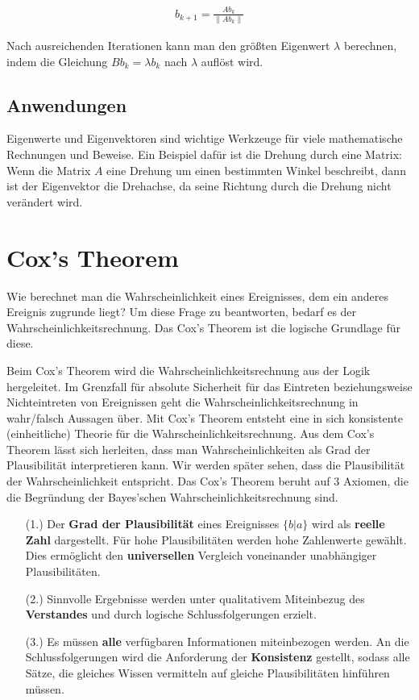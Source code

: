 \documentclass[]{dsadokumentation}
\begin{document}
\begin{equation}
  \begin{aligned}
    b_{k+1} = \frac{Ab_k}{\left\lVert Ab_k \right\rVert }
  \end{aligned}
\end{equation}

Nach ausreichenden Iterationen kann man den größten Eigenwert $\lambda$ berechnen, indem die Gleichung $B b_{k} = \lambda b_{k}$ nach $\lambda$ auflöst wird.


\subsection{Anwendungen}

Eigenwerte und Eigenvektoren sind wichtige Werkzeuge für viele mathematische Rechnungen und Beweise. Ein Beispiel dafür ist die Drehung durch eine Matrix: Wenn die Matrix $A$ eine Drehung um einen bestimmten Winkel beschreibt, dann ist der Eigenvektor die Drehachse, da seine Richtung durch die Drehung nicht verändert wird.

\section{Cox's Theorem}
Wie berechnet man die Wahrscheinlichkeit eines Ereignisses, dem ein anderes Ereignis zugrunde liegt? Um diese Frage zu beantworten, bedarf es der Wahrscheinlichkeitsrechnung. Das Cox's Theorem ist die logische Grundlage für diese.


Beim Cox's Theorem wird die Wahrscheinlichkeitsrechnung aus  der Logik hergeleitet. Im Grenzfall für absolute Sicherheit für das Eintreten beziehungsweise Nichteintreten von Ereignissen geht die Wahrscheinlichkeitsrechnung in wahr/falsch Aussagen über. Mit Cox's Theorem entsteht eine in sich konsistente (einheitliche) Theorie für die Wahrscheinlichkeitsrechnung.
Aus dem Cox's Theorem lässt sich herleiten, dass man Wahrscheinlichkeiten als Grad der Plausibilität interpretieren kann. Wir werden später sehen, dass die Plausibilität der Wahrscheinlichkeit entspricht.
Das Cox's Theorem beruht auf 3 Axiomen, die die Begründung der Bayes'schen Wahrscheinlichkeitsrechnung sind.


\begin{itemize}
  \item[(1.)] Der \textbf{Grad der Plausibilität} eines Ereignisses $\{b|a\}$ wird als \textbf {reelle Zahl} dargestellt. Für hohe Plausibilitäten werden hohe Zahlenwerte gewählt. Dies ermöglicht den \textbf {universellen} Vergleich voneinander unabhängiger Plausibilitäten.

  \item[(2.)] Sinnvolle Ergebnisse werden unter qualitativem Miteinbezug des \textbf {Verstandes} und durch logische Schlussfolgerungen erzielt.
  \item[(3.)] Es müssen \textbf {alle }verfügbaren Informationen miteinbezogen werden. An die Schlussfolgerungen wird die Anforderung der \textbf {Konsistenz }gestellt, sodass alle Sätze, die gleiches Wissen vermitteln auf gleiche Plausibilitäten hinführen müssen.
\end{itemize}
\end{document}
